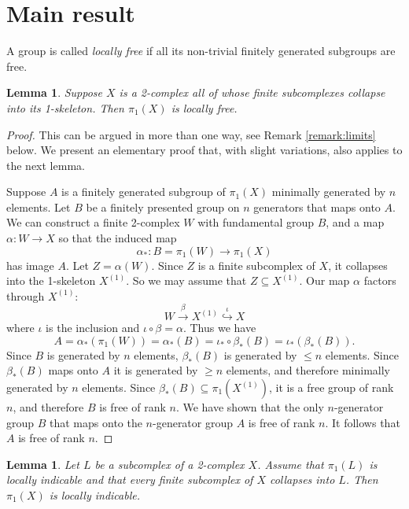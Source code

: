 \documentclass[12pt]{amsart}
\newtheorem{lemma}[thm]{Lemma}
\theoremstyle{definition}
\begin{document}

\section{Main result}

A group is called {\it locally free} if all its non-trivial finitely generated subgroups are free.


\begin{lemma}\label{lem:locfree}
Suppose $X$ is a 2-complex all of whose finite subcomplexes collapse into its 1-skeleton. Then $\pi_1(X)$ is locally free.
\end{lemma}

\begin{proof} 
This can be argued in more than one way, see Remark \ref{remark:limits} below. We present an elementary proof that, with slight variations, also applies to the next lemma.

Suppose $A$ is a finitely generated subgroup of $\pi_1(X)$ minimally generated by $n$ elements.
Let $B$ be a finitely presented group on $n$ generators that maps onto $A$. We can construct a finite 2-complex $W$ with fundamental group $B$, and a map $\alpha\colon W\to X$ so that the induced map 
$$\alpha_*\colon B=\pi_1(W)\to \pi_1(X)$$ has image $A$.
Let $Z=\alpha(W)$. Since $Z$ is a finite subcomplex of $X$, it collapses into the 1-skeleton $X^{(1)}$. 
So we may assume that $Z\subseteq X^{(1)}$. Our map $\alpha$ factors through $X^{(1)}$:
$$W\stackrel{\beta}{\to} X^{(1)}\stackrel{\iota}\hookrightarrow X$$
where $\iota$ is the inclusion and $\iota\circ \beta=\alpha$. Thus we have 
$$A=\alpha_*(\pi_1(W))=\alpha_*(B)=\iota_*\circ \beta_*(B)=\iota_*(\beta_*(B)).$$
Since $B$ is generated by $n$ elements, $\beta_*(B)$ is generated by $\le n$ elements. Since $\beta_*(B)$ maps onto $A$ it is generated by $\ge n$ elements, and therefore minimally generated by $n$ elements. Since $\beta_*(B)\subseteq \pi_1(X^{(1)})$, it is a free group of rank $n$, and therefore $B$ is free of rank $n$. We have shown that the only $n$-generator group $B$ that maps onto the $n$-generator group $A$ is free of rank $n$. It follows that $A$ is free of rank $n$.
\end{proof}

\begin{lemma}\label{lem:collapse} Let $L$ be a subcomplex of a 2-complex $X$. Assume that $\pi_1(L)$ is locally indicable and that every finite subcomplex of $X$ collapses into $L$. Then $\pi_1(X)$ is locally indicable.
\end{lemma}
\end{document}
